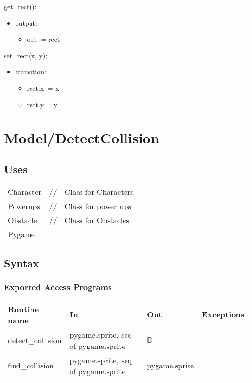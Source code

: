 \documentclass[12pt]{article}
\begin{document}
\noindent get\_rect():
\begin{itemize}
    \item output: 
    \begin{itemize}[]
        \item out := rect 
    \end{itemize}
\end{itemize}


\noindent set\_rect(x, y):
\begin{itemize}
    \item transition: 
    \begin{itemize}[]
        \item rect.x := x
        \item rect.y = y
    \end{itemize}
\end{itemize}



\newpage
\section*{Model/DetectCollision}

\subsection* {Uses}

\begin{tabular}{lll}
    Character & // & Class for Characters\\
    Powerups & // & Class for power ups\\
    Obstacle & // & Class for Obstacles\\
    Pygame
\end{tabular}

\subsection* {Syntax}

\subsubsection* {Exported Access Programs}

\begin{tabular}{| l | l | l | l |}
\hline
\textbf{Routine name} & \textbf{In} & \textbf{Out} & \textbf{Exceptions}\\
\hline
    detect\_collision & pygame.sprite, seq of pygame.sprite & $\mathbb{B}$  & ---\\
\hline
    find\_collision & pygame.sprite, seq of pygame.sprite & pygame.sprite  & ---\\
\hline
\end{tabular}
\end{document}
